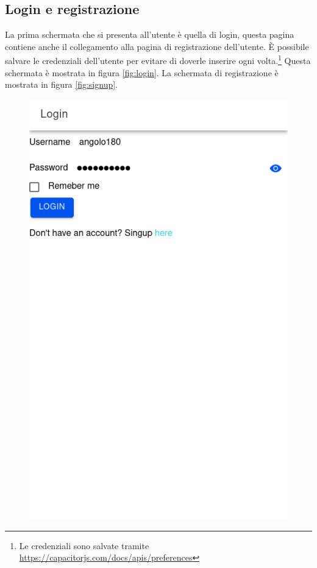 \documentclass{article}
\begin{document}
\subsection{Login e registrazione}
La prima schermata che si presenta all'utente è quella di login, questa pagina contiene anche il collegamento alla pagina di registrazione dell'utente. È possibile salvare le credenziali dell'utente per evitare di doverle inserire ogni volta.\footnote{ Le credenziali sono salvate tramite \url{https://capacitorjs.com/docs/apis/preferences}} Questa schermata è mostrata in figura \ref{fig:login}. La schermata di registrazione è mostrata in figura \ref{fig:signup}.
\begin{figure}[H]
    \begin{minipage}{0.48\textwidth}
        \includegraphics[width=\linewidth]{login.png}

\end{minipage}
\end{figure}
\end{document}
